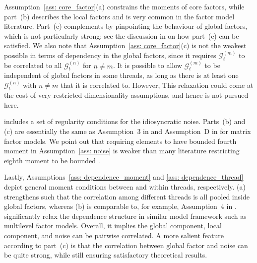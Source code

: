 \documentclass[aos]{imsart}
\theoremstyle{plain}
\theoremstyle{definition}
\def\cG{\mathcal{G}} \def\cH{\boldsymbol{\mathcal{H}}} \def\cI{\mathcal{I}}
\begin{document}
Assumption~\ref{ass: core_factor}(a) constrains the moments of core factors, while part~(b) describes the local factors and is very common in the factor model literature. Part~(c) complements  by pinpointing the behaviour of global factors, which is not particularly strong; see the discussion in  on how part~(c) can be satisfied.
We also note that Assumption~\ref{ass: core_factor}(c) is not the weakest possible in terms of dependency in the global factors, since it requires $\cG_t^{(m)}$ to be correlated to all $\cG_t^{(n)}$ for $n\neq m$. It is possible to allow $\cG_t^{(m)}$ to be independent of global factors in some threads, as long as there is at least one $\cG_t^{(n)}$ with $n\neq m$ that it is correlated to. However, This relaxation could come at the cost of very restricted dimensionality assumptions, and hence is not pursued here.

 includes a set of regularity conditions for the idiosyncratic noise. Parts~(b) and (c) are essentially the same as Assumption~3 in \cite{barigozzi2022statistical} and Assumption~D in \cite{yu2022projected} for matrix factor models. We point out that requiring elements to have bounded fourth moment in Assumption~\ref{ass: noise} is weaker than many literature restricting eighth moment to be bounded \citep[e.g.][]{Choietal2018, ChenFan2023, Huetal2025}.


Lastly, Assumptions~\ref{ass: dependence_moment} and \ref{ass: dependence_thread} depict general moment conditions between and within threads, respectively. (a) strengthens  such that the correlation among different threads is all pooled inside global factors, whereas (b) is comparable to, for example, Assumption~4 in \cite{barigozzi2022statistical}.  significantly relax the dependence structure in similar model framework such as multilevel factor models. Overall, it implies the global component, local component, and noise can be pairwise correlated. A more salient feature according to part~(c) is that the correlation between global factor and noise can be quite strong, while still ensuring satisfactory theoretical results.
\end{document}
